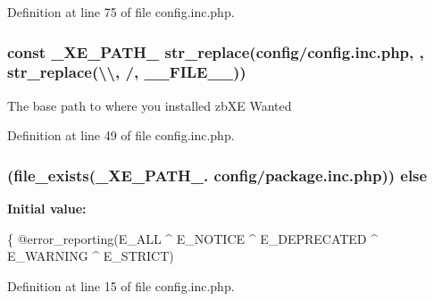 Definition at line 75 of file config.\+inc.\+php.

\subsubsection[{\texorpdfstring{\+\_\+\+X\+E\+\_\+\+P\+A\+T\+H\+\_\+}{_XE_PATH_}}]{\setlength{\rightskip}{0pt plus 5cm}const \+\_\+\+X\+E\+\_\+\+P\+A\+T\+H\+\_\+ str\+\_\+replace(\textquotesingle{}config/config.\+inc.\+php\textquotesingle{}, \textquotesingle{}\textquotesingle{}, str\+\_\+replace(\textquotesingle{}\textbackslash{}\textbackslash{}\textquotesingle{}, \textquotesingle{}/\textquotesingle{}, \+\_\+\+\_\+\+F\+I\+L\+E\+\_\+\+\_\+))}\hypertarget{config_8inc_8php_a5387c7a3f2aa38adf16f324cee88db88}{}\label{config_8inc_8php_a5387c7a3f2aa38adf16f324cee88db88}
The base path to where you installed zb\+XE Wanted 

Definition at line 49 of file config.\+inc.\+php.

\subsubsection[{\texorpdfstring{else}{else}}]{ (file\+\_\+exists(\+\_\+\+X\+E\+\_\+\+P\+A\+T\+H\+\_\+. \textquotesingle{}config/package.\+inc.\+php\textquotesingle{})) else}\hypertarget{config_8inc_8php_a249caa62ba3f93fa3cb8d963d5634fe1}{}\label{config_8inc_8php_a249caa62ba3f93fa3cb8d963d5634fe1}
{\bfseries Initial value\+:}
\begin{DoxyCode}
\{
    @error\_reporting(E\_ALL ^ E\_NOTICE ^ E\_DEPRECATED ^ E\_WARNING ^ E\_STRICT)
\end{DoxyCode}


Definition at line 15 of file config.\+inc.\+php.

